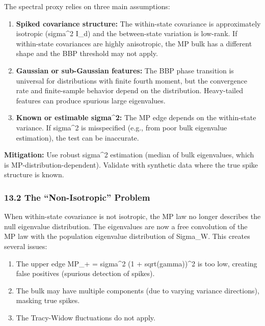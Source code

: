 \documentclass[
  12pt,
]{article}
\providecommand{\tightlist}{%
  \setlength{\itemsep}{0pt}\setlength{\parskip}{0pt}}
\begin{document}
The spectral proxy relies on three main assumptions:

\begin{enumerate}
\def\labelenumi{\arabic{enumi}.}
\item
  \textbf{Spiked covariance structure:} The within-state covariance is
  approximately isotropic (sigma\^{}2 I\_d) and the between-state
  variation is low-rank. If within-state covariances are highly
  anisotropic, the MP bulk has a different shape and the BBP threshold
  may not apply.
\item
  \textbf{Gaussian or sub-Gaussian features:} The BBP phase transition
  is universal for distributions with finite fourth moment, but the
  convergence rate and finite-sample behavior depend on the
  distribution. Heavy-tailed features can produce spurious large
  eigenvalues.
\item
  \textbf{Known or estimable sigma\^{}2:} The MP edge depends on the
  within-state variance. If sigma\^{}2 is misspecified (e.g., from poor
  bulk eigenvalue estimation), the test can be inaccurate.
\end{enumerate}

\textbf{Mitigation:} Use robust sigma\^{}2 estimation (median of bulk
eigenvalues, which is MP-distribution-dependent). Validate with
synthetic data where the true spike structure is known.

\subsubsection{13.2 The ``Non-Isotropic''
Problem}\label{the-non-isotropic-problem}

When within-state covariance is not isotropic, the MP law no longer
describes the null eigenvalue distribution. The eigenvalues are now a
free convolution of the MP law with the population eigenvalue
distribution of Sigma\_W. This creates several issues:

\begin{enumerate}
\def\labelenumi{\arabic{enumi}.}
\tightlist
\item
  The upper edge MP\_+ = sigma\^{}2 (1 + sqrt(gamma))\^{}2 is too low,
  creating false positives (spurious detection of spikes).
\item
  The bulk may have multiple components (due to varying variance
  directions), masking true spikes.
\item
  The Tracy-Widow fluctuations do not apply.
\end{enumerate}
\end{document}
